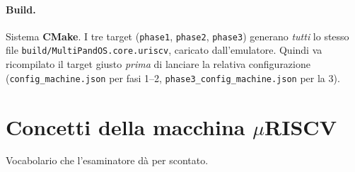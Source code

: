 \documentclass[11pt,a4paper]{article}
\newcommand{\code}[1]{\texttt{#1}}
\begin{document}
\paragraph{Build.} Sistema \textbf{CMake}. I tre target (\code{phase1},
\code{phase2}, \code{phase3}) generano \emph{tutti} lo stesso file
\code{build/MultiPandOS.core.uriscv}, caricato dall'emulatore. Quindi va
ricompilato il target giusto \emph{prima} di lanciare la relativa
configurazione (\code{config\_machine.json} per fasi 1--2,
\code{phase3\_config\_machine.json} per la 3).

\section{Concetti della macchina \texorpdfstring{$\mu$}{u}RISCV}

Vocabolario che l'esaminatore dà per scontato.
\end{document}
